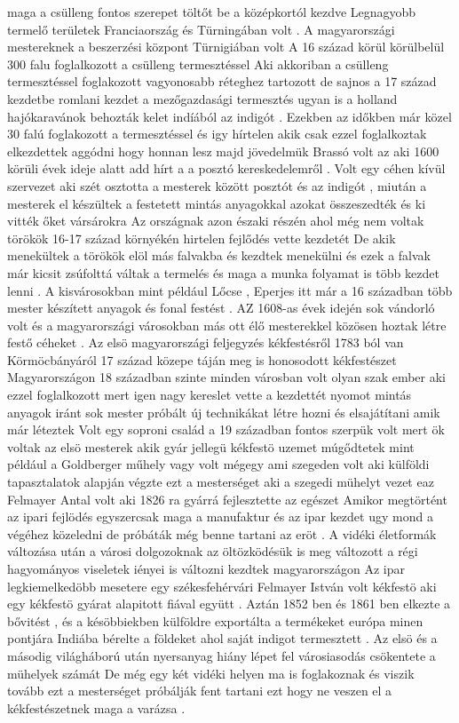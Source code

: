 \documentclass[fontsize=12pt, appendixprefix=true]{scrreprt}
\begin{document}
 maga a csülleng fontos szerepet töltőt be a középkortól kezdve 
 Legnagyobb termelő területek Franciaország és Türningában volt .
 A magyarországi mestereknek a beszerzési központ Türnigiában volt 
 A 16 század körül körülbelül 300 falu foglalkozott a csülleng termesztéssel 
 Aki akkoriban a csülleng termesztéssel foglakozott vagyonosabb réteghez tartozott
 de sajnos a 17 század kezdetbe romlani kezdet a mezőgazdasági termesztés ugyan is a holland hajókaravánok behozták kelet indíából az indigót .
 Ezekben az időkben már közel 30 falú foglakozott a termesztéssel és igy hírtelen akik csak ezzel foglalkoztak elkezdettek aggódni hogy honnan lesz majd jövedelmük 
 Brassó volt az  aki 1600 körüli évek ideje alatt add hírt a a posztó kereskedelemről .
 Volt egy céhen kívül szervezet aki szét osztotta a mesterek között  posztót és az indigót , miután a mesterek el készültek a festetett mintás anyagokkal azokat összeszedték és ki vitték őket vársárokra 
 Az országnak azon északi részén ahol még nem voltak törökök 16-17 század környékén hirtelen fejlődés vette kezdetét 
 De akik menekültek a törökök elöl más falvakba és kezdtek menekülni és ezek a falvak már kicsit zsúfolttá váltak a termelés és maga a munka folyamat is több kezdet lenni .
 A kisvárosokban mint például Lőcse , Eperjes itt már a 16 században több mester  készített anyagok és fonal festést .
 AZ 1608-as évek idején sok vándorló volt és a magyarországi városokban más ott élő mesterekkel közösen hoztak létre festő céheket .
 Az elsö magyarországi feljegyzés kékfestésről 1783 ból van Körmöcbányáról 
 17 század közepe táján  meg is honosodott kékfestészet Magyarországon 
 18 században szinte minden városban volt olyan szak ember aki ezzel foglalkozott mert igen nagy kereslet vette a kezdettét nyomot mintás anyagok iránt sok mester próbált új technikákat létre hozni és elsajátítani amik már léteztek 
 Volt egy soproni család a 19 században  fontos szerpük volt mert ök voltak az elsö mesterek akik gyár jellegü kékfestö uzemet múgődtetek mint például a Goldberger műhely vagy volt mégegy ami szegeden volt  aki külföldi tapasztalatok alapján végzte ezt a mesterséget  aki a szegedi mühelyt vezet eaz Felmayer Antal volt aki 1826 ra gyárrá fejlesztette az egészet 
 Amikor megtörtént az ipari fejlödés egyszercsak maga a manufaktur és az ipar kezdet ugy mond a végéhez közeledni de próbáták még benne tartani az eröt .
A vidéki életformák változása után a városi dolgozoknak az öltözködésük is meg változott a régi hagyományos viseletek iényei is változni kezdtek magyarországon 
Az ipar legkiemelkedöbb mesetere egy székesfehérvári Felmayer István volt  kékfestö  aki egy kékfestö gyárat alapitott fiával együtt .
Aztán 1852 ben és 1861 ben  elkezte a bővitést , és a késöbbiekben külföldre exportálta a termékeket európa minen pontjára Indiába bérelte a földeket ahol saját indigot termesztett .
Az elsö és a másodig világháború után nyersanyag hiány lépet fel városiasodás csökentete a mühelyek számát 
De még egy két vidéki helyen ma is foglakoznak és viszik tovább ezt a mesterséget próbálják fent tartani ezt hogy ne veszen el a kékfestészetnek maga a varázsa .
\end{document}
